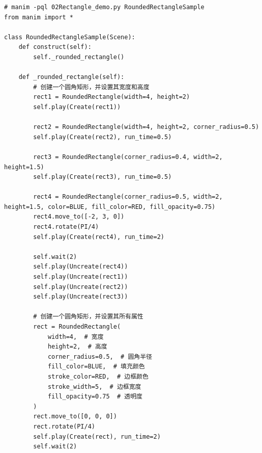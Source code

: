 \begin{lstlisting}[style=pythonstyle]
# manim -pql 02Rectangle_demo.py RoundedRectangleSample
from manim import *

class RoundedRectangleSample(Scene):
    def construct(self):
        self._rounded_rectangle()

    def _rounded_rectangle(self):
        # 创建一个圆角矩形，并设置其宽度和高度
        rect1 = RoundedRectangle(width=4, height=2)
        self.play(Create(rect1))

        rect2 = RoundedRectangle(width=4, height=2, corner_radius=0.5)
        self.play(Create(rect2), run_time=0.5)

        rect3 = RoundedRectangle(corner_radius=0.4, width=2, height=1.5)
        self.play(Create(rect3), run_time=0.5)

        rect4 = RoundedRectangle(corner_radius=0.5, width=2, height=1.5, color=BLUE, fill_color=RED, fill_opacity=0.75)
        rect4.move_to([-2, 3, 0])
        rect4.rotate(PI/4)
        self.play(Create(rect4), run_time=2)

        self.wait(2)
        self.play(Uncreate(rect4))
        self.play(Uncreate(rect1))
        self.play(Uncreate(rect2))
        self.play(Uncreate(rect3))

        # 创建一个圆角矩形，并设置其所有属性
        rect = RoundedRectangle(
            width=4,  # 宽度
            height=2,  # 高度
            corner_radius=0.5,  # 圆角半径
            fill_color=BLUE,  # 填充颜色
            stroke_color=RED,  # 边框颜色
            stroke_width=5,  # 边框宽度
            fill_opacity=0.75  # 透明度
        )
        rect.move_to([0, 0, 0])
        rect.rotate(PI/4)
        self.play(Create(rect), run_time=2)
        self.wait(2)
\end{lstlisting}

